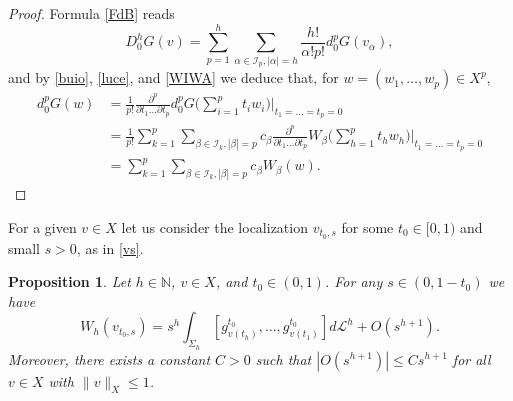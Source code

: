 \documentclass[12pt, reqno]{amsart}
\theoremstyle{plain}
\newtheorem {proposition} [theorem]{Proposition}
\theoremstyle{definition}
\theoremstyle{remark}
\numberwithin{equation}{section}
\newcommand{\N}{\mathbb{N}}
\renewcommand{\L}{\mathcal{L}}
\newcommand{\I}{\mathcal{I}}
\newcommand{\e}{\varepsilon}
\newcommand{\0}{\theta}
\renewcommand{\d}{\partial}
\renewcommand{\a}{\alpha}
\renewcommand{\b}{\beta}
\newcommand{\1}{{-1}}
\renewcommand{\=}{\coloneqq}
\renewcommand{\.}{\dots}
\newcommand{\mc}{\mathcal}
\newcommand{\be}{\begin{equation}}
\newcommand{\ee}{\end{equation}}
\begin{document}
\begin{proof}
Formula \eqref{FdB} reads
\begin{equation}\label{pluto3}
 D_0^hG(v )=\sum_{p=1}^h\sum_{\a\in\I_p, |\a|=h}\frac{h !}{\a!p!}d_0^pG(v_\a),
\end{equation}
and by \eqref{buio}, \eqref{luce}, and \eqref{WIWA} we deduce that,   for $w=(w_1,\dots,w_p)\in X ^p$, 
\begin{equation}\label{PLAT}
\begin{split} 
d_0^p G(w) & =\frac{1}{p!} \frac{\partial ^p}{\partial t_1 \dots \partial t_p} 
 d_0^pG\Big(\sum_{i=1}^p t_i w_i\Big)\bigg| _{t_1=\dots=t_p=0}
 \\
 & =\frac{1}{p!}
  \sum_{k=1}^p\sum_{\b \in\I_k, |\b|=p}  c_\b \frac{\partial ^p}{\partial t_1 \dots \partial t_p} 
 W_{\b}\Big( \sum_{h=1}^p t_h w_h\Big)\bigg| _{t_1=\dots=t_p=0}
 \\
 &
 =
  \sum_{k=1}^p\sum_{\b\in\I_k, |\b|=p}  c_\b   W_{\b}(w) .
 \end{split}
\end{equation}
 

\end{proof}
%


For  a given $v\in X $ let us consider the localization $v_{t_0,s}$ for some $t_0\in[0,1)$ and 
small $s>0$, as in \eqref{vs}. 



\renewcommand{\0}{\vartheta}


\begin{proposition} \label{PIX} 
Let $h\in\N$,  $v\in X $, and  $ t_0\in (0,1)$. For any $s \in (0, 1-t_0)$ we have   
  \be
  \label{Wn}
  W_h( v_{t_0,s})=%
  s^h\int_{\Sigma_h} [ g_{v(t_h)}^{t_0},\dots,  g_{v(t_1)}^{t_0}] d\L^h + O(s^{h+1}).
 \ee
 Moreover, there exists a constant $C>0$ such that $ |O(s^{h+1})|\leq C s^{h+1}$ for all $v\in X$ with $\| v\|_X\leq 1$.
\end{proposition}
\end{document}
